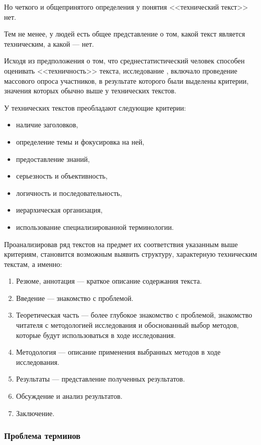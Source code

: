 Но четкого и общепринятого определения у понятия <<технический текст>> нет.

Тем не менее, у людей есть общее представление о том, какой текст является техническим, а какой --- нет.

Исходя из предположения о том, что среднестатистический человек способен оценивать <<техничность>> текста, исследование \cite{tt}, включало проведение массового опроса участников, в результате которого были выделены критерии, значения которых обычно выше у технических текстов.

У технических текстов преобладают следующие критерии:
\begin{itemize}
    \item наличие заголовков,
    \item определение темы и фокусировка на ней,
    \item предоставление знаний,
    \item серьезность и объективность,
    \item логичность и последовательность,
    \item иерархическая организация,
    \item использование специализированной терминологии.
\end{itemize}

Проанализировав ряд текстов на предмет их соответствия указанным выше критериям, становится возможным выявить структуру, характерную техническим текстам, а именно:
\begin{enumerate}
    \item Резюме, аннотация --- краткое описание содержания текста.
    \item Введение --- знакомство с проблемой.
    \item Теоретическая часть --- более глубокое знакомство с проблемой, знакомство читателя с методологией исследования и обоснованный выбор методов, которые будут использоваться в ходе исследования.
    \item Методология --- описание применения выбранных методов в ходе исследования.
    \item Результаты --- представление полученных результатов.
    \item Обсуждение и анализ результатов.
    \item Заключение.
\end{enumerate}

\subsubsection{Проблема терминов}


